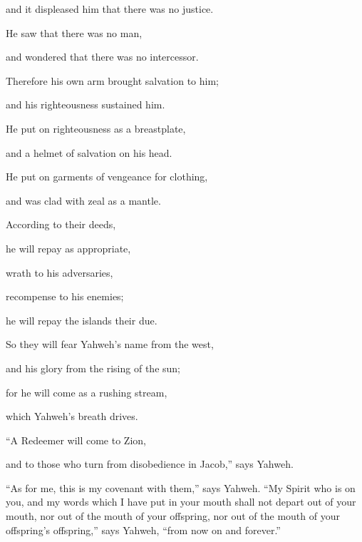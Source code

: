 {\par }{\QB and it displeased him that there was no justice.
\par }{\Q {}He saw that there was no man,
\par }{\QB and wondered that there was no intercessor.
\par }{\Q Therefore his own arm brought salvation to him;
\par }{\QB and his righteousness sustained him.
\par }{\Q {}He put on righteousness as a breastplate,
\par }{\QB and a helmet of salvation on his head.
\par }{\Q He put on garments of vengeance for clothing,
\par }{\QB and was clad with zeal as a mantle.
\par }{\Q {}According to their deeds,
\par }{\QB he will repay as appropriate,
\par }{\QB wrath to his adversaries,
\par }{\QB recompense to his enemies;
\par }{\QB he will repay the islands their due.
\par }{\Q {}So they will fear Yahweh’s name from the west,
\par }{\QB and his glory from the rising of the sun;
\par }{\Q for he will come as a rushing stream,
\par }{\QB which Yahweh’s breath drives.
\par }{\BB \par }{\Q {}“A Redeemer will come to Zion,
\par }{\QB and to those who turn from disobedience in Jacob,” says Yahweh.
\par }{\PP {}“As for me, this is my covenant with them,” says Yahweh. “My Spirit who is on you, and my words which I have put in your mouth shall not depart out of your mouth, nor out of the mouth of your offspring, nor out of the mouth of your offspring’s offspring,” says Yahweh, “from now on and forever.”

}
